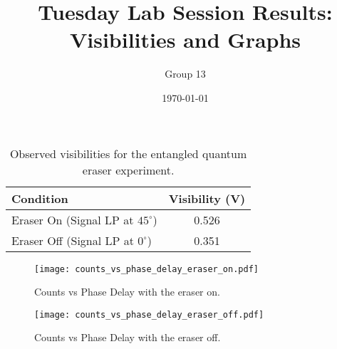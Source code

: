 \documentclass{article}
\title{Tuesday Lab Session Results: Visibilities and Graphs}
\author{Group 13} %
\date{\today}
\begin{document}
\pagestyle{empty} %

\begin{table}[h!]
\centering
\begin{tabular}{lc}
\toprule
\textbf{Condition} & \textbf{Visibility (V)} \\
\midrule
Eraser On (Signal LP at $45^\circ$)          & 0.526 \\
Eraser Off (Signal LP at $0^\circ$) & 0.351 \\
\bottomrule
\end{tabular}
\caption{Observed visibilities for the entangled quantum eraser experiment.}
\end{table}


\begin{figure}[h!]
\centering
\texttt{[image: counts\_vs\_phase\_delay\_eraser\_on.pdf]}
\caption{Counts vs Phase Delay with the eraser on.}
\label{fig:eraser_on}
\end{figure}


\begin{figure}[h!]
\centering
\texttt{[image: counts\_vs\_phase\_delay\_eraser\_off.pdf]}
\caption{Counts vs Phase Delay with the eraser off.}
\label{fig:eraser_off}
\end{figure}
\end{document}
